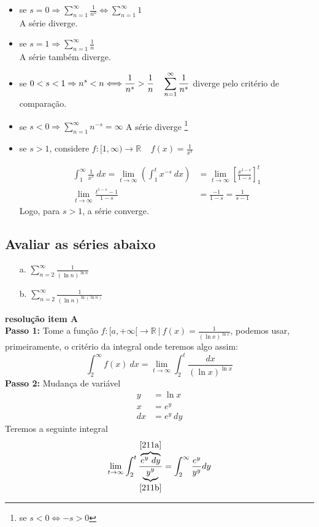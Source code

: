 \documentclass[12pt,openany, letterpaper]{book}
\begin{document}
\begin{itemize}
\item se $\displaystyle{s = 0} \Rightarrow \sum_{n = 1}^{\infty} \frac{1}{n^0} \Longleftrightarrow \sum_{n = 1}^{\infty} 1$ \\ A série diverge.
\item se $\displaystyle{s = 1} \Rightarrow \sum_{n = 1}^{\infty} \frac{1}{n}$ \\ A série também diverge.
\item se $\displaystyle{0 < s < 1 \Rightarrow n^s < n \Longleftrightarrow \frac{1}{n^s} > \frac{1}{n} \ \ \ \vspace{5mm} \sum_{n = 1}^{\infty} \frac{1}{n^s}}$ diverge pelo critério de comparação.
\item se $\displaystyle{s < 0} \Rightarrow \sum_{n = 1}^{\infty} n^{-s} = \infty$ A série diverge \footnote{se $s < 0 \Longleftrightarrow -s > 0$}
\item se $s > 1$, considere $f: [1, \infty) \rightarrow \mathds{R} \ \ \ \ \ f(x) = \frac{1}{x^s}$

\begin{align*}
\int_1^{\infty} \frac{1}{x^s} \ dx = \lim_{t \rightarrow \infty} \left(\int_1^t x^{-s} \ dx \right) &= \lim_{t \rightarrow \infty} \left[\frac{x^{1-s}}{1-s} \right]_1^t \\
\lim_{t \rightarrow \infty} \frac{t^{1-s}-1}{1-s} &= \frac{-1}{1-s} = \frac{1}{s-1}
\end{align*}
Logo, para $s > 1$, a série converge.
\end{itemize}

\subsection*{Avaliar as séries abaixo} \label{avaliar}
\begin{itemize}
\item [a.] $\displaystyle{\sum_{n=2}^{\infty} \frac{1}{(\ln n)^{\ln n}}}$ 
\item [b.] $\displaystyle{\sum_{n=2}^{\infty} \frac{1}{(\ln n)^{\ln(\ln n)}}}$
\end{itemize}
\textbf{resolução item A}
\\
\textbf{Passo 1:} Tome a função $f:[a, +\infty[ \rightarrow \mathds{R} \ | \  f(x) = \displaystyle{\frac{1}{(\ln x)^{\ln x}}}$, podemos usar, primeiramente, o critério da integral onde teremos algo assim: $$\int_2^{\infty} f(x) \ dx = \lim_{t \rightarrow \infty} \int_2^t \displaystyle{\frac{dx}{(\ln x)^{\ln x}}}$$
\textbf{Passo 2:} Mudança de variável
\begin{align}
y &= \ln x \\ \label{211a}
x &= e^y \\ 
dx &= e^y \ dy \label{211b}
\end{align}
Teremos a seguinte integral $$\lim_{t \rightarrow \infty} \int_2^t \displaystyle{\frac{\overbrace{e^y \ dy}^{\ref{211a}}}{\underbrace{y^y}_{\ref{211b}}}} = \int_2^{\infty} \frac{e^y}{y^y} dy$$
\end{document}
